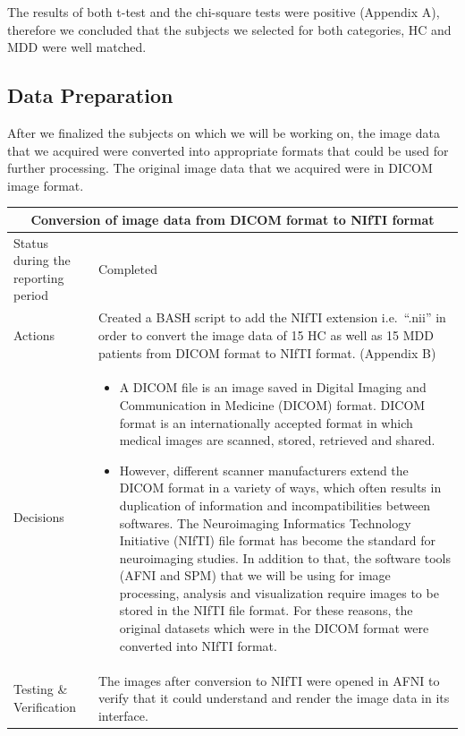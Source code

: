 \documentclass[12pt]{article}
\begin{document}
The results of both t-test and the chi-square tests were positive
(Appendix A), therefore we concluded that the subjects we selected for
both categories, HC and MDD were well matched.

\newpage
\subsection{Data Preparation}%

After we finalized the subjects on which we will be working on, the
image data that we acquired were converted into appropriate formats
that could be used for further processing. The original image data
that we acquired were in DICOM image format.

\begin{table}[H]
  \centering
  \begin{tabular} {| m{3.3cm} | m{11.5cm} | }
    \hline
    \multicolumn{2}{|c|}{Conversion of image data from DICOM format to
    NIfTI format} \\ \hline
    Status during the reporting period   & Completed   \\ \hline
    Actions &
    Created a BASH script to add the NIfTI extension i.e.~``.nii'' in
    order to convert the image data of 15 HC as well as 15 MDD
    patients from DICOM format to NIfTI format. (Appendix B) \\ \hline

    Decisions &
    \begin{itemize}

      \item A DICOM file is an image saved in Digital Imaging and
        Communication in Medicine (DICOM) format.  DICOM format is an
        internationally accepted format in which medical images are
        scanned, stored, retrieved and shared.

      \item However, different scanner manufacturers extend the DICOM
        format in a variety of ways, which often results in
        duplication of information and incompatibilities between
        softwares. The Neuroimaging Informatics Technology Initiative
        (NIfTI) file format has become the standard for neuroimaging
        studies. In addition to that, the software tools (AFNI and
        SPM) that we will be using for image processing, analysis and
        visualization require images to be stored in the NIfTI file
        format. For these reasons, the original datasets which were in
        the DICOM format were converted into NIfTI format.

    \end{itemize} \\ \hline

    Testing \& Verification &
    The images after conversion to NIfTI were opened in AFNI to verify
    that it could understand and render the image data in its
    interface. \\

    \hline

  \end{tabular}
\end{table}
\end{document}
